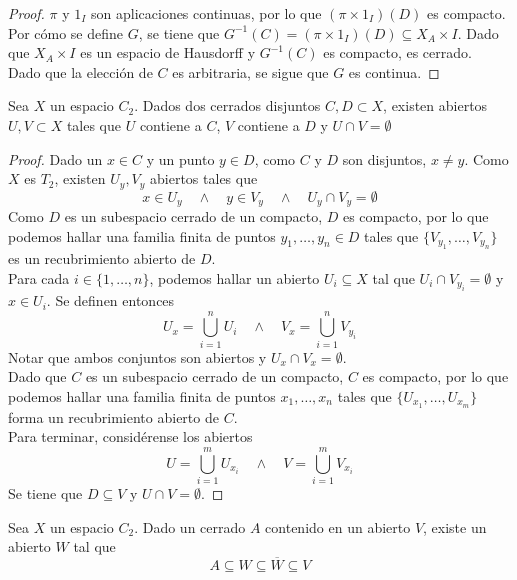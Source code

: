 \begin{proof}
$\pi$ y $1_I$ son aplicaciones continuas, por lo que $(\pi\times 1_I)(D)$ es compacto. Por cómo se define $G$, se tiene que $G^{-1}(C)=(\pi\times 1_I)(D) \subseteq X_A \times I$. Dado que $X_A\times I$ es un espacio de Hausdorff y $G^{-1}(C)$ es compacto, es cerrado.
\\

Dado que la elección de $C$ es arbitraria, se sigue que $G$ es continua.\end{proof}

\begin{lema} Sea $X$ un espacio $C_2$. Dados dos cerrados disjuntos $C,D \subset X$, existen abiertos $U,V \subset X$ tales que $U$ contiene a $C$, $V$ contiene a $D$ y $U\cap V=\emptyset$ \end{lema}

\begin{proof}
Dado un $x \in C$ y un punto $y \in D$, como $C$ y $D$ son disjuntos, $x \neq y$. Como $X$ es $T_2$, existen $U_y, V_y$ abiertos tales que $$x \in U_y \quad\land\quad y \in V_y \quad\land\quad U_y\cap V_y=\emptyset$$ Como $D$ es un subespacio cerrado de un compacto, $D$ es compacto, por lo que podemos hallar una familia finita de puntos $y_1,\dots,y_n \in D$ tales que $\{V_{y_1},\dots, V_{y_n}\}$ es un recubrimiento abierto de $D$.
\\

Para cada $i \in \{1,\dots,n\}$, podemos hallar un abierto $U_i \subseteq X$ tal que $U_i\cap V_{y_i}=\emptyset$ y $x \in U_i$. Se definen entonces $$U_x=\bigcup_{i=1}^nU_i \quad\land\quad V_x=\bigcup_{i=1}^n V_{y_i}$$ Notar que ambos conjuntos son abiertos y $U_x\cap V_x=\emptyset$.
\\

Dado que $C$ es un subespacio cerrado de un compacto, $C$ es compacto, por lo que podemos hallar una familia finita de puntos $x_1,\dots,x_n$ tales que $\{U_{x_1},\dots,U_{x_m}\}$ forma un recubrimiento abierto de $C$.
\\

Para terminar, considérense los abiertos $$U=\bigcup _{i=1}^m U_{x_i} \quad\land\quad V=\bigcup_{i=1}^m V_{x_i}$$ Se tiene que $D \subseteq V$ y $U\cap V=\emptyset$.
\end{proof}

\begin{lema}\label{LemaB} Sea $X$ un espacio $C_2$. Dado un cerrado $A$ contenido en un abierto $V$, existe un abierto $W$ tal que $$A \subseteq W \subseteq \overline{W} \subseteq V$$\end{lema}

